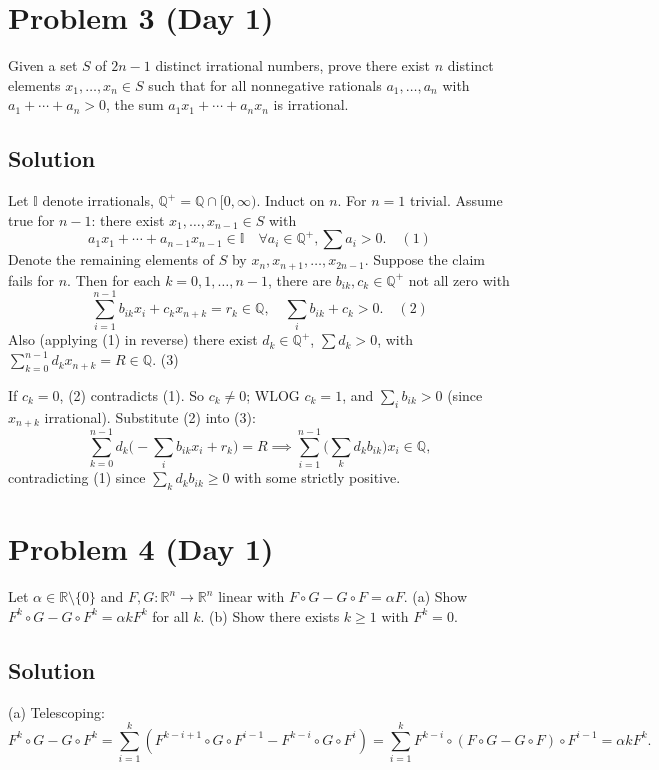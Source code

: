 \documentclass{article}
\begin{document}
\section*{Problem 3 (Day 1)}
Given a set $S$ of $2n - 1$ distinct irrational numbers, prove there exist $n$ distinct elements $x_1, \ldots, x_n \in S$ such that for all nonnegative rationals $a_1, \ldots, a_n$ with $a_1 + \cdots + a_n > 0$, the sum $a_1 x_1 + \cdots + a_n x_n$ is irrational.

\subsection*{Solution}
Let $\mathbb{I}$ denote irrationals, $\mathbb{Q}^+ = \mathbb{Q} \cap [0, \infty)$. Induct on $n$. For $n=1$ trivial. Assume true for $n-1$: there exist $x_1, \ldots, x_{n-1} \in S$ with
\[
a_1 x_1 + \cdots + a_{n-1}x_{n-1} \in \mathbb{I} \quad \forall a_i \in \mathbb{Q}^+, \sum a_i > 0. \quad (1)
\]
Denote the remaining elements of $S$ by $x_n, x_{n+1}, \ldots, x_{2n-1}$. Suppose the claim fails for $n$. Then for each $k = 0, 1, \ldots, n-1$, there are $b_{ik}, c_k \in \mathbb{Q}^+$ not all zero with
\[
\sum_{i=1}^{n-1} b_{ik} x_i + c_k x_{n+k} = r_k \in \mathbb{Q}, \quad \sum_i b_{ik} + c_k > 0. \quad (2)
\]
Also (applying (1) in reverse) there exist $d_k \in \mathbb{Q}^+$, $\sum d_k > 0$, with $\sum_{k=0}^{n-1} d_k x_{n+k} = R \in \mathbb{Q}$. (3)

If $c_k = 0$, (2) contradicts (1). So $c_k \neq 0$; WLOG $c_k = 1$, and $\sum_i b_{ik} > 0$ (since $x_{n+k}$ irrational). Substitute (2) into (3):
\[
\sum_{k=0}^{n-1} d_k\Big(-\sum_i b_{ik} x_i + r_k\Big) = R \implies \sum_{i=1}^{n-1}\Big(\sum_k d_k b_{ik}\Big) x_i \in \mathbb{Q},
\]
contradicting (1) since $\sum_k d_k b_{ik} \geq 0$ with some strictly positive.

\section*{Problem 4 (Day 1)}
Let $\alpha \in \mathbb{R}\setminus\{0\}$ and $F, G: \mathbb{R}^n \to \mathbb{R}^n$ linear with $F\circ G - G\circ F = \alpha F$.
(a) Show $F^k \circ G - G \circ F^k = \alpha k F^k$ for all $k$.
(b) Show there exists $k \geq 1$ with $F^k = 0$.

\subsection*{Solution}
(a) Telescoping:
\[
F^k \circ G - G \circ F^k = \sum_{i=1}^k (F^{k-i+1} \circ G \circ F^{i-1} - F^{k-i} \circ G \circ F^i) = \sum_{i=1}^k F^{k-i} \circ (F\circ G - G\circ F) \circ F^{i-1} = \alpha k F^k.
\]
\end{document}
